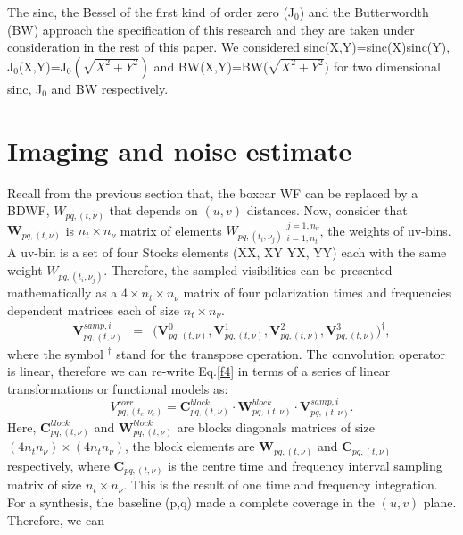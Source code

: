 \documentclass[useAMS,usenatbib]{mn2e}
\begin{document}
\hspace{-0.6cm}The sinc, the Bessel of the first kind of order zero (J$_0$) and the Butterwordth (BW)  
approach the specification of this 
research and they are taken under consideration in the rest of this paper.  We considered sinc(X,Y)=sinc(X)sinc(Y), 
J$_0$(X,Y)=J$_0(\sqrt{X^2 + Y^2})$ and BW(X,Y)=BW($\sqrt{X^2 + Y^2})$ for  two dimensional 
sinc, J$_0$ and BW respectively.




\section{Imaging and noise estimate}
\label{sec:imaging}
Recall from the previous section that, the boxcar WF can be replaced by a BDWF, $W_{pq,(t,\nu)}$ that depends 
on $(u,v)$ distances. Now, consider that $\mathcal{\textbf{W}}_{pq,(t,\nu)}$ is  $n_t \times n_{\nu}$ matrix of elements 
$W_{pq,(t_i,\nu_j)}\Big|_{i=1,n_t}^{j=1, n_{\nu}}$, the weights of uv-bins. A uv-bin is a set of four Stocks elements (XX, XY YX, YY) each 
with the same weight $W_{pq,(t_i,\nu_j)}$. Therefore, the sampled visibilities can be presented mathematically as a $4\times n_t\times 
n_{\nu}$ matrix of four polarization times and frequencies dependent matrices each of size $n_t\times n_{\nu}$.
\begin{eqnarray*}
\mathbf{V}_{pq,(t,\nu)}^{samp,i}&=&\Bigg(\mathbf{V}_{pq,(t,\nu)}^{0},\mathbf { V } 
^1_{pq,(t,\nu)},\mathbf{V}^2_{pq,(t,\nu)},\mathbf{V}_{pq,(t,\nu)}^{3 } \Bigg)^{\dagger}, \label{eqx:conv}
\end{eqnarray*}
where the symbol $^{\dagger}$ stand for the transpose operation. The convolution operator is linear, therefore we can re-write Eq.\ref{f4} 
in terms of a series of linear transformations or functional models as:
\begin{equation}
V_{pq,(t_c,\nu_c)}^{corr}= \mathbf{C}_{pq,(t,\nu)}^{block}\cdot\mathbf{W}_{pq,(t,\nu)}^{block}\cdot 
\mathbf{V}_{pq,(t,\nu)}^{samp,i}.\label{eqbb:linear}
\end{equation}
Here, $\mathbf{C}_{pq,(t,\nu)}^{block}$ and $\mathbf{W}_{pq,(t,\nu)}^{block}$ are  blocks diagonals matrices of size $(4n_t 
n_{\nu})\times(4n_t n_{\nu})$, the block elements are $\mathcal{\textbf{W}}_{pq,(t,\nu)}$ and $\mathbf{C}_{pq,(t,\nu)}$ 
respectively, where $\mathbf{C}_{pq,(t,\nu)}$ is the centre time and frequency interval sampling matrix of size $n_t\times 
n_{\nu}$. This
is the result of one time and frequency integration.
For a synthesis, the baseline (p,q) made a complete  coverage in the $(u,v)$ plane. Therefore, we can  
\end{document}
